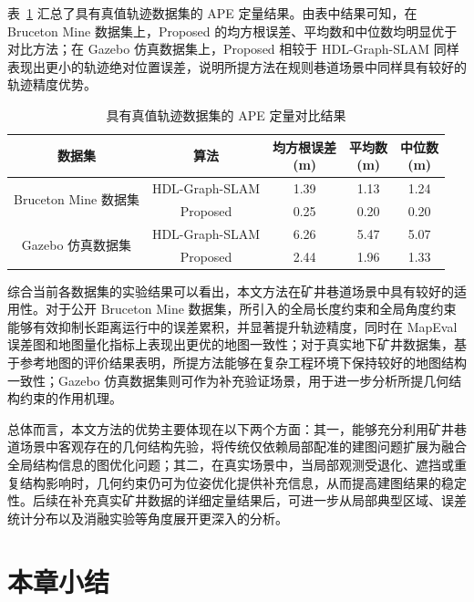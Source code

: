 表~\ref{tab:result_summary} 汇总了具有真值轨迹数据集的 APE 定量结果。由表中结果可知，在 Bruceton Mine 数据集上，Proposed 的均方根误差、平均数和中位数均明显优于对比方法；在 Gazebo 仿真数据集上，Proposed 相较于 HDL-Graph-SLAM 同样表现出更小的轨迹绝对位置误差，说明所提方法在规则巷道场景中同样具有较好的轨迹精度优势。

\begin{table}[htbp]
    \centering
    \caption{具有真值轨迹数据集的 APE 定量对比结果}
    \label{tab:result_summary}
    \small
    \begin{tabular}{ccccc}
        \toprule
        数据集 & 算法 & \shortstack{均方根误差\\(m)} & \shortstack{平均数\\(m)} & \shortstack{中位数\\(m)} \\
        \midrule
        \multirow{2}{*}{Bruceton Mine 数据集} & HDL-Graph-SLAM & 1.39 & 1.13 & 1.24 \\
         & Proposed & 0.25 & 0.20 & 0.20 \\
        \multirow{2}{*}{Gazebo 仿真数据集} & HDL-Graph-SLAM & 6.26 & 5.47 & 5.07 \\
         & Proposed & 2.44 & 1.96 & 1.33 \\
        \bottomrule
    \end{tabular}
\end{table}

综合当前各数据集的实验结果可以看出，本文方法在矿井巷道场景中具有较好的适用性。对于公开 Bruceton Mine 数据集，所引入的全局长度约束和全局角度约束能够有效抑制长距离运行中的误差累积，并显著提升轨迹精度，同时在 MapEval 误差图和地图量化指标上表现出更优的地图一致性；对于真实地下矿井数据集，基于参考地图的评价结果表明，所提方法能够在复杂工程环境下保持较好的地图结构一致性；Gazebo 仿真数据集则可作为补充验证场景，用于进一步分析所提几何结构约束的作用机理。

总体而言，本文方法的优势主要体现在以下两个方面：其一，能够充分利用矿井巷道场景中客观存在的几何结构先验，将传统仅依赖局部配准的建图问题扩展为融合全局结构信息的图优化问题；其二，在真实场景中，当局部观测受退化、遮挡或重复结构影响时，几何约束仍可为位姿优化提供补充信息，从而提高建图结果的稳定性。后续在补充真实矿井数据的详细定量结果后，可进一步从局部典型区域、误差统计分布以及消融实验等角度展开更深入的分析。

\section{本章小结}

